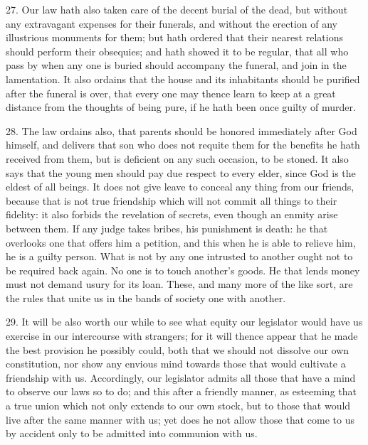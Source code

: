 27. Our law hath also taken care of the decent burial of the dead, but
without any extravagant expenses for their funerals, and without the
erection of any illustrious monuments for them; but hath ordered that
their nearest relations should perform their obsequies; and hath showed it
to be regular, that all who pass by when any one is buried should
accompany the funeral, and join in the lamentation. It also ordains that
the house and its inhabitants should be purified after the funeral is
over, that every one may thence learn to keep at a great distance from the
thoughts of being pure, if he hath been once guilty of murder.

28. The law ordains also, that parents should be honored immediately after
God himself, and delivers that son who does not requite them for the
benefits he hath received from them, but is deficient on any such
occasion, to be stoned. It also says that the young men should pay due
respect to every elder, since God is the eldest of all beings. It does not
give leave to conceal any thing from our friends, because that is not true
friendship which will not commit all things to their fidelity: it also
forbids the revelation of secrets, even though an enmity arise between
them. If any judge takes bribes, his punishment is death: he that
overlooks one that offers him a petition, and this when he is able to
relieve him, he is a guilty person. What is not by any one intrusted to
another ought not to be required back again. No one is to touch another's
goods. He that lends money must not demand usury for its loan. These, and
many more of the like sort, are the rules that unite us in the bands of
society one with another.

29. It will be also worth our while to see what equity our legislator
would have us exercise in our intercourse with strangers; for it will
thence appear that he made the best provision he possibly could, both that
we should not dissolve our own constitution, nor show any envious mind
towards those that would cultivate a friendship with us. Accordingly, our
legislator admits all those that have a mind to observe our laws so to do;
and this after a friendly manner, as esteeming that a true union which not
only extends to our own stock, but to those that would live after the same
manner with us; yet does he not allow those that come to us by accident
only to be admitted into communion with us.


